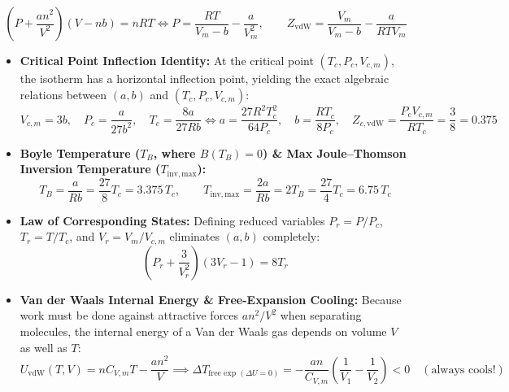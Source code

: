 \begin{formulacard}
\begin{equation}\label{eq:06:vdw}
  \boxed{\left(P + \frac{a n^2}{V^2}\right)(V - nb) = nRT} \iff \boxed{P = \frac{RT}{V_m - b} - \frac{a}{V_m^2}}, \qquad Z_{\mathrm{vdW}} = \frac{V_m}{V_m - b} - \frac{a}{RTV_m}
\end{equation}
\begin{itemize}
  \item \textbf{Critical Point Inflection Identity:} At the critical point $(T_c, P_c, V_{c,m})$, the isotherm has a horizontal inflection point, yielding the exact algebraic relations between $(a, b)$ and $(T_c, P_c, V_{c,m})$:
  \begin{equation}\label{eq:06:vdw-crit}
    V_{c,m} = 3b, \quad P_c = \frac{a}{27b^2}, \quad T_c = \frac{8a}{27Rb} \iff \boxed{a = \frac{27 R^2 T_c^2}{64 P_c}, \quad b = \frac{R T_c}{8 P_c}, \quad Z_{c,\mathrm{vdW}} = \frac{P_c V_{c,m}}{R T_c} = \frac{3}{8} = 0.375}
  \end{equation}
  \item \textbf{Boyle Temperature ($T_B$, where $B(T_B) = 0$) \& Max Joule--Thomson Inversion Temperature ($T_{\mathrm{inv,max}}$):}
  \begin{equation}\label{eq:06:boyle-inv}
    T_B = \frac{a}{Rb} = \frac{27}{8}T_c = 3.375\,T_c, \qquad T_{\mathrm{inv,max}} = \frac{2a}{Rb} = 2T_B = \frac{27}{4}T_c = 6.75\,T_c
  \end{equation}
  \item \textbf{Law of Corresponding States:} Defining reduced variables $P_r = P/P_c$, $T_r = T/T_c$, and $V_r = V_m/V_{c,m}$ eliminates $(a,b)$ completely:
  \begin{equation}\label{eq:06:reduced-vdw}
    \left(P_r + \frac{3}{V_r^2}\right)(3V_r - 1) = 8T_r
  \end{equation}
  \item \textbf{Van der Waals Internal Energy \& Free-Expansion Cooling:} Because work must be done against attractive forces $a n^2/V^2$ when separating molecules, the internal energy of a Van der Waals gas depends on volume $V$ as well as $T$:
  \begin{equation}\label{eq:06:vdw-u}
    \boxed{U_{\mathrm{vdW}}(T,V) = nC_{V,m}T - \frac{a n^2}{V}} \implies \Delta T_{\text{free exp }(\Delta U = 0)} = -\frac{an}{C_{V,m}}\left(\frac{1}{V_1} - \frac{1}{V_2}\right) < 0 \quad (\text{always cools!})
  \end{equation}
\end{itemize}
\end{formulacard}

